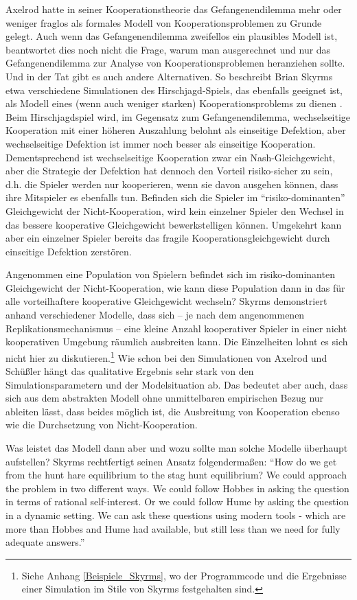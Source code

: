 \documentclass[12pt,a4paper,ngerman]{article}
\begin{document}
Axelrod hatte in seiner Kooperationstheorie das Gefangenendilemma mehr
oder weniger fraglos als formales Modell von Kooperationsproblemen zu
Grunde gelegt.  Auch wenn das Gefangenendilemma zweifellos ein
plausibles Modell ist, beantwortet dies noch nicht die Frage, warum
man ausgerechnet und nur das Gefangenendilemma zur Analyse von
Kooperationsproblemen heranziehen sollte. Und in der Tat gibt es auch
andere Alternativen. So beschreibt Brian Skyrms etwa verschiedene
Simulationen des Hirschjagd-Spiels, das ebenfalls geeignet ist, als
Modell eines (wenn auch weniger starken) Kooperationsproblems zu
dienen \cite{skyrms:2004}. Beim Hirschjagdspiel wird, im Gegensatz zum
Gefangenendilemma, wechselseitige Kooperation mit einer höheren
Auszahlung belohnt als einseitige Defektion, aber wechselseitige
Defektion ist immer noch besser als einseitige
Kooperation. Dementsprechend ist wechselseitige Kooperation zwar ein
Nash-Gleichgewicht, aber die Strategie der Defektion hat dennoch den
Vorteil risiko-sicher zu sein, d.h. die Spieler werden nur
kooperieren, wenn sie davon ausgehen können, dass ihre Mitspieler es
ebenfalls tun. Befinden sich die Spieler im "`risiko-dominanten"'
Gleichgewicht der Nicht-Kooperation, wird kein einzelner Spieler den
Wechsel in das bessere kooperative Gleichgewicht bewerkstelligen
können. Umgekehrt kann aber ein einzelner Spieler bereits das fragile
Kooperationsgleichgewicht durch einseitige Defektion zerstören.

Angenommen eine Population von Spielern befindet sich im
risiko-dominanten Gleichgewicht der Nicht-Kooperation, wie kann diese
Population dann in das für alle vorteilhaftere kooperative
Gleichgewicht wechseln? Skyrms demonstriert anhand verschiedener
Modelle, dass sich -- je nach dem angenommenen Replikationsmechanismus
-- eine kleine Anzahl kooperativer Spieler in einer nicht kooperativen
Umgebung räumlich ausbreiten kann. Die Einzelheiten lohnt es sich
nicht hier zu diskutieren.\footnote{Siehe Anhang
  \ref{Beispiele_Skyrms}, wo der Programmcode und die Ergebnisse einer
  Simulation im Stile von Skyrms festgehalten sind.} Wie schon bei den
Simulationen von Axelrod und Schüßler hängt das qualitative Ergebnis
sehr stark von den Simulationsparametern und der Modelsituation ab.
Das bedeutet aber auch, dass sich aus dem abstrakten Modell ohne
unmittelbaren empirischen Bezug nur ableiten lässt, dass beides
möglich ist, die Ausbreitung von Kooperation ebenso wie die
Durchsetzung von Nicht-Kooperation.

Was leistet das Modell dann aber und wozu sollte man solche Modelle
überhaupt aufstellen? Skyrms rechtfertigt seinen Ansatz
folgendermaßen: "`How do we get from the hunt hare equilibrium to the
stag hunt equilibrium? We could approach the problem in two different
ways. We could follow Hobbes in asking the question in terms of
rational self-interest. Or we could follow Hume by asking the question
in a dynamic setting. We can ask these questions using modern tools -
which are more than Hobbes and Hume had available, but still less than
we need for fully adequate answers."' \cite[S. 10]{skyrms:2004}
\end{document}
